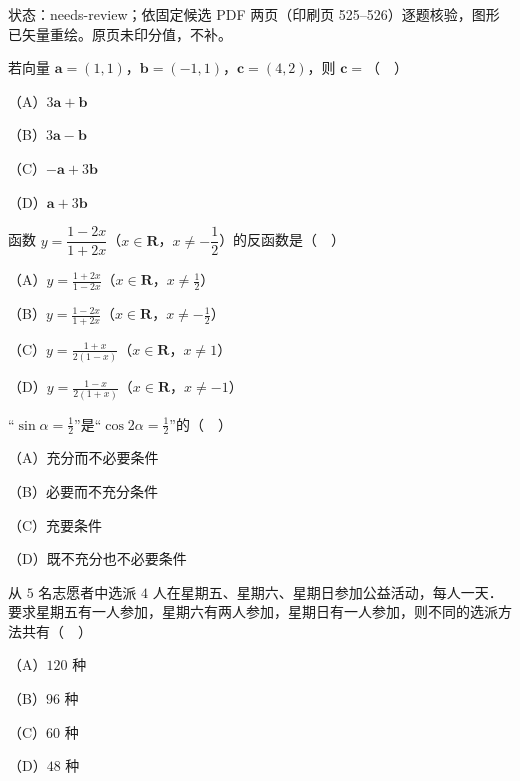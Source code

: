 

状态：needs-review；依固定候选 PDF 两页（印刷页 525–526）逐题核验，图形已矢量重绘。原页未印分值，不补。


\begin{question}
若向量 $\boldsymbol a=(1,1)$，$\boldsymbol b=(-1,1)$，$\boldsymbol c=(4,2)$，则 $\boldsymbol c=$（　）

（A）$3\boldsymbol a+\boldsymbol b$

（B）$3\boldsymbol a-\boldsymbol b$

（C）$-\boldsymbol a+3\boldsymbol b$

（D）$\boldsymbol a+3\boldsymbol b$

\end{question}
\begin{question}
函数 $y=\dfrac{1-2x}{1+2x}$（$x\in\mathbf R$，$x\neq-\dfrac12$）的反函数是（　）

（A）$y=\frac{1+2x}{1-2x}$（$x\in\mathbf R$，$x\neq\frac12$）

（B）$y=\frac{1-2x}{1+2x}$（$x\in\mathbf R$，$x\neq-\frac12$）

（C）$y=\frac{1+x}{2(1-x)}$（$x\in\mathbf R$，$x\neq1$）

（D）$y=\frac{1-x}{2(1+x)}$（$x\in\mathbf R$，$x\neq-1$）

\end{question}
\begin{question}
“$\sin\alpha=\frac12$”是“$\cos2\alpha=\frac12$”的（　）

（A）充分而不必要条件

（B）必要而不充分条件

（C）充要条件

（D）既不充分也不必要条件

\end{question}
\begin{question}
从 $5$ 名志愿者中选派 $4$ 人在星期五、星期六、星期日参加公益活动，每人一天．要求星期五有一人参加，星期六有两人参加，星期日有一人参加，则不同的选派方法共有（　）

（A）$120$ 种

（B）$96$ 种

（C）$60$ 种

（D）$48$ 种

\end{question}
